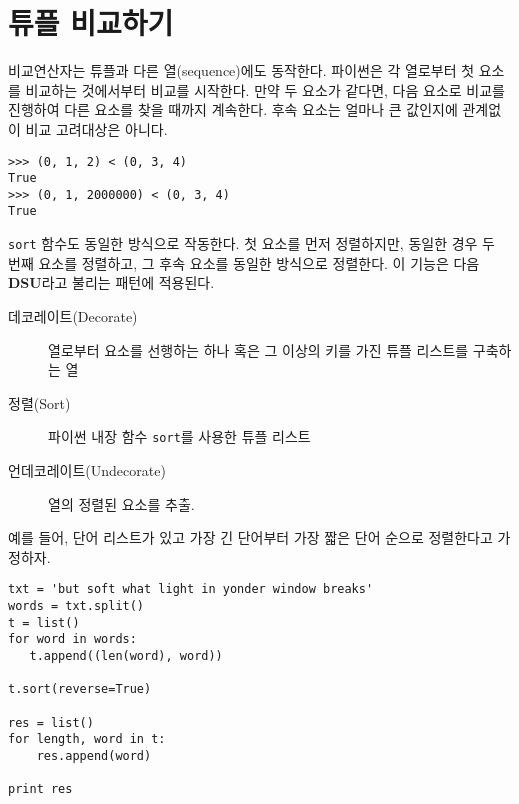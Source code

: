 \section{튜플 비교하기}


비교연산자는 튜플과 다른 열(sequence)에도 동작한다. 파이썬은 각 열로부터 첫 요소를 비교하는 것에서부터 비교를 시작한다.
만약 두 요소가 같다면, 다음 요소로 비교를 진행하여 다른 요소를 찾을 때까지 계속한다. 후속 요소는 얼마나 큰 값인지에 관계없이 비교 고려대상은 아니다.

\beforeverb
\begin{verbatim}
>>> (0, 1, 2) < (0, 3, 4)
True
>>> (0, 1, 2000000) < (0, 3, 4)
True
\end{verbatim}
\afterverb
%

{\tt sort} 함수도 동일한 방식으로 작동한다.
첫 요소를 먼저 정렬하지만, 동일한 경우 두 번째 요소를 정렬하고, 그 후속 요소를 동일한 방식으로 정렬한다.
이 기능은 다음 {\bf DSU}라고 불리는 패턴에 적용된다.

\begin{description}

\item[데코레이트(Decorate)] 열로부터 요소를 선행하는 하나 혹은 그 이상의 키를 가진 튜플 리스트를 구축하는 열

\item[정렬(Sort)] 파이썬 내장 함수 {\tt sort}를 사용한 튜플 리스트

\item[언데코레이트(Undecorate)]  열의 정렬된 요소를 추출.

\end{description}

\label{DSU}
예를 들어, 단어 리스트가 있고 가장 긴 단어부터 가장 짧은 단어 순으로 정렬한다고 가정하자.

\beforeverb
\begin{verbatim}
txt = 'but soft what light in yonder window breaks'
words = txt.split()
t = list()
for word in words:
   t.append((len(word), word))

t.sort(reverse=True)

res = list()
for length, word in t:
    res.append(word)

print res
\end{verbatim}
\afterverb
%


